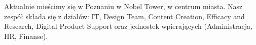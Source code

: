 \documentclass[11pt,twoside,b5paper]{book}
\begin{document}
Aktualnie mieścimy się w Poznaniu w Nobel Tower, w centrum miasta. Nasz zespół składa się z działów: IT, Design Team, Content Creation, Efficacy and Research, Digital Product Support oraz jednostek wpierających (Administracja, HR, Finanse).

\backmatter
\small \printindex[a]

\clearpage\phantom{}
 \thispagestyle{empty}
\clearpage\phantom{}
 \thispagestyle{empty}


\end{document}
